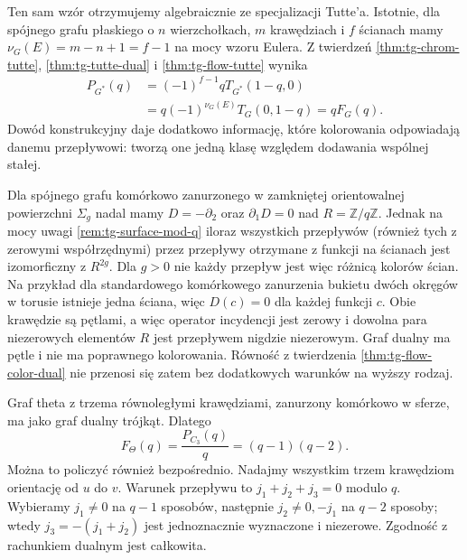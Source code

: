 Ten sam wzór otrzymujemy algebraicznie ze specjalizacji
Tutte'a. Istotnie, dla spójnego grafu płaskiego o $n$
wierzchołkach, $m$ krawędziach i $f$ ścianach mamy
$\nu_G(E)=m-n+1=f-1$ na mocy wzoru Eulera.
Z twierdzeń \ref{thm:tg-chrom-tutte},
\ref{thm:tg-tutte-dual} i \ref{thm:tg-flow-tutte} wynika
\[
\begin{aligned}
P_{G^*}(q)
&=(-1)^{f-1}qT_{G^*}(1-q,0)\\
&=q(-1)^{\nu_G(E)}T_G(0,1-q)
=qF_G(q).
\end{aligned}
\]
Dowód konstrukcyjny daje dodatkowo informację,
które kolorowania odpowiadają danemu przepływowi:
tworzą one jedną klasę względem dodawania wspólnej stałej.

\begin{uwaga}
Dla spójnego grafu komórkowo zanurzonego
w zamkniętej orientowalnej powierzchni $\Sigma_g$
nadal mamy $D=-\partial_2$ oraz $\partial_1D=0$
nad $R=\mathbb Z/q\mathbb Z$.
Jednak na mocy uwagi \ref{rem:tg-surface-mod-q}
iloraz wszystkich przepływów (również tych
z zerowymi współrzędnymi) przez przepływy
otrzymane z funkcji na ścianach jest izomorficzny
z $R^{2g}$. Dla $g>0$ nie każdy przepływ
jest więc różnicą kolorów ścian.
Na przykład dla standardowego komórkowego
zanurzenia bukietu dwóch okręgów w torusie
istnieje jedna ściana, więc $D(c)=0$ dla
każdej funkcji $c$. Obie krawędzie są pętlami,
a więc operator incydencji jest zerowy i
dowolna para niezerowych elementów $R$
jest przepływem nigdzie niezerowym.
Graf dualny ma pętle i nie ma poprawnego
kolorowania. Równość z twierdzenia
\ref{thm:tg-flow-color-dual} nie przenosi się
zatem bez dodatkowych warunków na wyższy rodzaj.
\end{uwaga}

\pagebreak[4]
\begin{przyklad}
Graf theta z trzema równoległymi krawędziami, zanurzony
komórkowo w sferze, ma jako graf dualny trójkąt. Dlatego
\[
 F_{\Theta}(q)=\frac{P_{C_3}(q)}{q}=(q-1)(q-2).
\]
Można to policzyć również bezpośrednio. Nadajmy wszystkim
trzem krawędziom orientację od $u$ do $v$.
Warunek przepływu to $j_1+j_2+j_3=0$ modulo $q$.
Wybieramy $j_1\ne0$ na $q-1$ sposobów, następnie
$j_2\ne0,-j_1$ na $q-2$ sposoby; wtedy
$j_3=-(j_1+j_2)$ jest jednoznacznie wyznaczone i niezerowe.
Zgodność z rachunkiem dualnym jest całkowita.
\end{przyklad}

